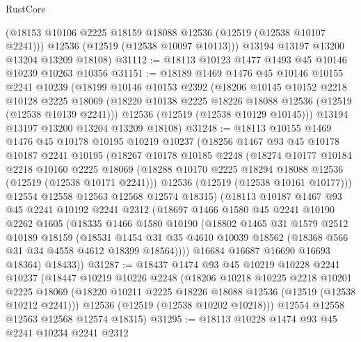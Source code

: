 \begin{lexlean}{RustCore}
\begin{coremodule}
        (@18153 @10106 @2225 @18159 @18088 @12536 (@12519 (@12538 @10107 @2241)))
        @12536
        (@12519 (@12538 @10097 @10113)))
      @13194
      @13197
      @13200
      @13204
      @13209
      @18108)
@31112 := @18113 @10123 @1477 @1493 @45 @10146 @10239 @10263 @10356
@31151 := @18189
    @1469
    @1476
    @45
    @10146
    @10155
    @2241
    @10239
    (@18199
      @10146
      @10153
      @2392
      (@18206
        @10145
        @10152
        @2218
        @10128
        @2225
        @18069
        (@18220 @10138 @2225 @18226 @18088 @12536 (@12519 (@12538 @10139 @2241)))
        @12536
        (@12519 (@12538 @10129 @10145)))
      @13194
      @13197
      @13200
      @13204
      @13209
      @18108)
@31248 := @18113
    @10155
    @1469
    @1476
    @45
    @10178
    @10195
    @10219
    @10237
    (@18256
      @1467
      @93
      @45
      @10178
      @10187
      @2241
      @10195
      (@18267
        @10178
        @10185
        @2248
        (@18274
          @10177
          @10184
          @2218
          @10160
          @2225
          @18069
          (@18288 @10170 @2225 @18294 @18088 @12536 (@12519 (@12538 @10171 @2241)))
          @12536
          (@12519 (@12538 @10161 @10177)))
        @12554
        @12558
        @12563
        @12568
        @12574
        @18315)
      (@18113
        @10187
        @1467
        @93
        @45
        @2241
        @10192
        @2241
        @2312
        (@18697
          @1466
          @1580
          @45
          @2241
          @10190
          @2262
          @1605
          (@18335
            @1466
            @1580
            @10190
            (@18802
              @1465
              @31
              @1579
              @2512
              @10189
              @18159
              (@18531
                @1454
                @31
                @35
                @4610
                @10039
                @18562
                (@18368 @566 @31 @34 @4558 @4612 @18399 @18564))))
          @16684
          @16687
          @16690
          @16693
          @18364)
        @18433))
@31287 := @18437
    @1474
    @93
    @45
    @10219
    @10228
    @2241
    @10237
    (@18447
      @10219
      @10226
      @2248
      (@18206
        @10218
        @10225
        @2218
        @10201
        @2225
        @18069
        (@18220 @10211 @2225 @18226 @18088 @12536 (@12519 (@12538 @10212 @2241)))
        @12536
        (@12519 (@12538 @10202 @10218)))
      @12554
      @12558
      @12563
      @12568
      @12574
      @18315)
@31295 := @18113 @10228 @1474 @93 @45 @2241 @10234 @2241 @2312

\end{coremodule}
\end{lexlean}
